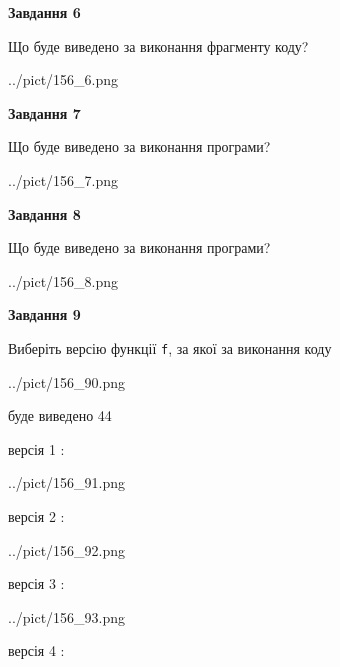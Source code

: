 \documentclass[12pt, ukrainian]{article}
\def\code#1{\Verb!#1!}
\begin{document}
{\begin {large}
{\begin {center}\textbf{Завдання 6}\end {center}}

Що буде виведено за виконання фрагменту коду?\par
\begin{center}
	{../pict/156_6.png}
\end{center}
\newpage

{\begin {center}\textbf{Завдання 7}\end {center}}

Що буде виведено за виконання програми?\par
\begin{center}
	{../pict/156_7.png}
\end{center}
\newpage

{\begin {center}\textbf{Завдання 8}\end {center}}

Що буде виведено за виконання програми?\par
\begin{center}
	{../pict/156_8.png}
\end{center}
\newpage

{\begin {center}\textbf{Завдання 9}\end {center}}

Виберіть версію функції \code{f}, за якої за виконання коду
\begin{center}
	{../pict/156_90.png}
\end{center}
буде виведено 44

\vspace{5mm}
версія 1 :

\begin{center}
	{../pict/156_91.png}
\end{center}
версія 2 :

\begin{center}
	{../pict/156_92.png}
\end{center}
версія 3 :

\begin{center}
	{../pict/156_93.png}
\end{center}
версія 4 :


\end{large}}
\end{document}
